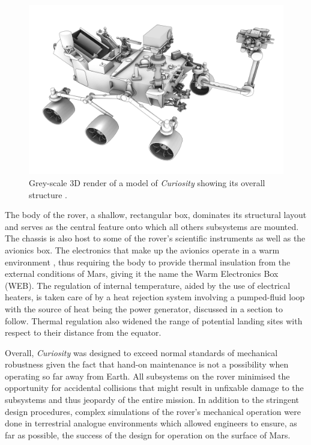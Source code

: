         \begin{figure}[h!]
          \centering
          \includegraphics[width=0.75\linewidth]{figures/litReview-curiosityStructure}
          \caption[Grey-scale 3D render of a model of \textit{Curiosity} showing its overall structure.]{Grey-scale 3D render of a model of \textit{Curiosity} showing its overall structure \cite{nasa3D}.}
          \label{fig:litReview-curiosityStructure}
        \end{figure}
        
        The body of the rover, a shallow, rectangular box, dominates its structural layout and serves as the central feature onto which all others subsystems are mounted. The chassis is also host to some of the rover's scientific instruments as well as the avionics box. The electronics that make up the avionics operate in a warm environment \cite{nasajulypresskit}, thus requiring the body to provide thermal insulation from the external conditions of Mars, giving it the name the Warm Electronics Box (WEB). The regulation of internal temperature, aided by the use of electrical heaters, is taken care of by a heat rejection system involving a pumped-fluid loop with the source of heat being the power generator, discussed in a section to follow. Thermal regulation also widened the range of potential landing sites with respect to their distance from the equator.
        
        Overall, \textit{Curiosity} was designed to exceed normal standards of mechanical robustness given the fact that hand-on maintenance is not a possibility when operating so far away from Earth. All subsystems on the rover minimised the opportunity for accidental collisions that might result in unfixable damage to the subsystems and thus jeopardy of the entire mission. In addition to the stringent design procedures, complex simulations of the rover's mechanical operation were done in terrestrial analogue environments which allowed engineers to ensure, as far as possible, the success of the design for operation on the surface of Mars.
        
